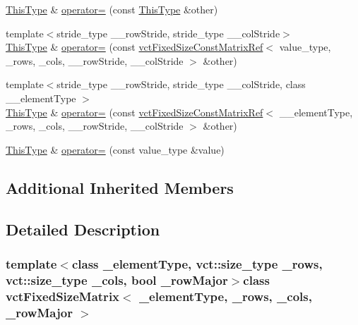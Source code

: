 \begin{DoxyCompactItemize}
\item 
\hyperlink{classvct_fixed_size_const_matrix_base_a7ec66a96ed7e08ce9ff54093133c9d8d}{This\+Type} \& \hyperlink{classvct_fixed_size_matrix_a8e90a51be113cb8f4c938585bb68502d}{operator=} (const \hyperlink{classvct_fixed_size_const_matrix_base_a7ec66a96ed7e08ce9ff54093133c9d8d}{This\+Type} \&other)
\item 
{\footnotesize template$<$stride\+\_\+type \+\_\+\+\_\+row\+Stride, stride\+\_\+type \+\_\+\+\_\+col\+Stride$>$ }\\\hyperlink{classvct_fixed_size_const_matrix_base_a7ec66a96ed7e08ce9ff54093133c9d8d}{This\+Type} \& \hyperlink{classvct_fixed_size_matrix_ab7ba5576b32e4ef485c6c0ea65f85573}{operator=} (const \hyperlink{classvct_fixed_size_const_matrix_ref}{vct\+Fixed\+Size\+Const\+Matrix\+Ref}$<$ value\+\_\+type, \+\_\+rows, \+\_\+cols, \+\_\+\+\_\+row\+Stride, \+\_\+\+\_\+col\+Stride $>$ \&other)
\item 
{\footnotesize template$<$stride\+\_\+type \+\_\+\+\_\+row\+Stride, stride\+\_\+type \+\_\+\+\_\+col\+Stride, class \+\_\+\+\_\+element\+Type $>$ }\\\hyperlink{classvct_fixed_size_const_matrix_base_a7ec66a96ed7e08ce9ff54093133c9d8d}{This\+Type} \& \hyperlink{classvct_fixed_size_matrix_a2bee3fa557c0678e571d4625d51eace1}{operator=} (const \hyperlink{classvct_fixed_size_const_matrix_ref}{vct\+Fixed\+Size\+Const\+Matrix\+Ref}$<$ \+\_\+\+\_\+element\+Type, \+\_\+rows, \+\_\+cols, \+\_\+\+\_\+row\+Stride, \+\_\+\+\_\+col\+Stride $>$ \&other)
\item 
\hyperlink{classvct_fixed_size_const_matrix_base_a7ec66a96ed7e08ce9ff54093133c9d8d}{This\+Type} \& \hyperlink{classvct_fixed_size_matrix_a1e319188c5af6d885a191e290f0e7b40}{operator=} (const value\+\_\+type \&value)
\end{DoxyCompactItemize}
\subsection*{Additional Inherited Members}


\subsection{Detailed Description}
\subsubsection*{template$<$class \+\_\+element\+Type, vct\+::size\+\_\+type \+\_\+rows, vct\+::size\+\_\+type \+\_\+cols, bool \+\_\+row\+Major$>$class vct\+Fixed\+Size\+Matrix$<$ \+\_\+element\+Type, \+\_\+rows, \+\_\+cols, \+\_\+row\+Major $>$}

